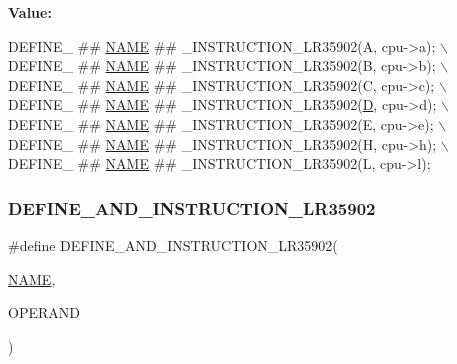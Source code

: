 {\bfseries Value\+:}
\begin{DoxyCode}
DEFINE\_ ## \mbox{\hyperlink{inflate_8h_a164ea0159d5f0b5f12a646f25f99eceaa67bc2ced260a8e43805d2480a785d312}{NAME}} ## \_INSTRUCTION\_LR35902(A, cpu->a); \(\backslash\)
    DEFINE\_ ## \mbox{\hyperlink{inflate_8h_a164ea0159d5f0b5f12a646f25f99eceaa67bc2ced260a8e43805d2480a785d312}{NAME}} ## \_INSTRUCTION\_LR35902(B, cpu->b); \(\backslash\)
    DEFINE\_ ## \mbox{\hyperlink{inflate_8h_a164ea0159d5f0b5f12a646f25f99eceaa67bc2ced260a8e43805d2480a785d312}{NAME}} ## \_INSTRUCTION\_LR35902(C, cpu->c); \(\backslash\)
    DEFINE\_ ## \mbox{\hyperlink{inflate_8h_a164ea0159d5f0b5f12a646f25f99eceaa67bc2ced260a8e43805d2480a785d312}{NAME}} ## \_INSTRUCTION\_LR35902(\mbox{\hyperlink{_aes_8c_adef282f11138cda3d081cc21280a8d12}{D}}, cpu->d); \(\backslash\)
    DEFINE\_ ## \mbox{\hyperlink{inflate_8h_a164ea0159d5f0b5f12a646f25f99eceaa67bc2ced260a8e43805d2480a785d312}{NAME}} ## \_INSTRUCTION\_LR35902(E, cpu->e); \(\backslash\)
    DEFINE\_ ## \mbox{\hyperlink{inflate_8h_a164ea0159d5f0b5f12a646f25f99eceaa67bc2ced260a8e43805d2480a785d312}{NAME}} ## \_INSTRUCTION\_LR35902(H, cpu->h); \(\backslash\)
    DEFINE\_ ## \mbox{\hyperlink{inflate_8h_a164ea0159d5f0b5f12a646f25f99eceaa67bc2ced260a8e43805d2480a785d312}{NAME}} ## \_INSTRUCTION\_LR35902(L, cpu->l);
\end{DoxyCode}
\mbox{\label{isa-lr35902_8c_ae1080a83b34389ed2ca28d988d21fe00}} 
\subsubsection{\texorpdfstring{D\+E\+F\+I\+N\+E\+\_\+\+A\+N\+D\+\_\+\+I\+N\+S\+T\+R\+U\+C\+T\+I\+O\+N\+\_\+\+L\+R35902}{DEFINE\_AND\_INSTRUCTION\_LR35902}}
{\footnotesize\ttfamily \#define D\+E\+F\+I\+N\+E\+\_\+\+A\+N\+D\+\_\+\+I\+N\+S\+T\+R\+U\+C\+T\+I\+O\+N\+\_\+\+L\+R35902(\begin{DoxyParamCaption}\item[{}]{\mbox{\hyperlink{inflate_8h_a164ea0159d5f0b5f12a646f25f99eceaa67bc2ced260a8e43805d2480a785d312}{N\+A\+ME}},  }\item[{}]{O\+P\+E\+R\+A\+ND }\end{DoxyParamCaption})}

